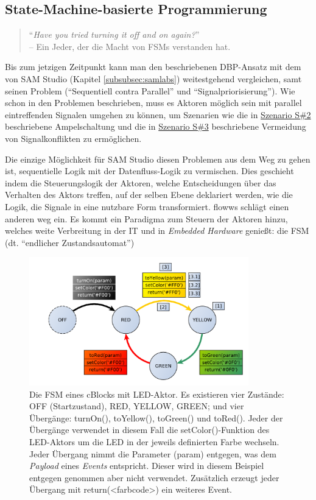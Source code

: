 \subsection{State-Machine-basierte Programmierung}\label{subsec:fsmprogrammierung}
\begin{quote}
    "`\textit{Have you tried turning it off and on again?}"'  \\ -- Ein Jeder, der die Macht von \acp{FSM} verstanden hat.
\end{quote}

Bis zum jetzigen Zeitpunkt kann man den beschriebenen \ac{DBP}-Ansatz mit dem von SAM Studio (Kapitel \ref{subsubsec:samlabs}) weitestgehend vergleichen, samt seinen Problem ("`Sequentiell contra Parallel"' und "`Signalpriorisierung"'). Wie schon in den Problemen beschrieben, muss es Aktoren möglich sein mit parallel eintreffenden Signalen umgehen zu können, um Szenarien wie die in \hyperref[szenario2]{Szenario S\#2}  beschriebene Ampelschaltung und die in \hyperref[szenario3]{Szenario S\#3} beschriebene Vermeidung von Signalkonflikten zu ermöglichen.

Die einzige Möglichkeit für SAM Studio diesen Problemen aus dem Weg zu gehen ist, sequentielle Logik mit der Datenfluss-Logik zu vermischen. Dies geschieht indem die Steuerungslogik der Aktoren, welche Entscheidungen über das Verhalten des Aktors treffen, auf der selben Ebene deklariert werden, wie die Logik, die Signale in eine nutzbare Form transformiert. flowws schlägt einen anderen weg ein. Es kommt ein Paradigma zum Steuern der Aktoren hinzu, welches weite Verbreitung in der IT und in \textit{Embedded Hardware} genießt: die \acl{FSM} (dt. "`endlicher Zustandsautomat"')

\begin{figure}[h]
  \centering
  \includegraphics[width=0.85\textwidth]{bilder/chapter4/chapter4_2/beispielstatemachine.pdf}
  \caption{Die \ac{FSM} eines cBlocks mit LED-Aktor. Es existieren vier Zustände: OFF (Startzustand), RED, YELLOW, GREEN; und vier Übergänge: turnOn(), toYellow(), toGreen() und toRed(). Jeder der Übergänge verwendet in diesem Fall die setColor()-Funktion des LED-Aktors um die LED in der jeweils definierten Farbe wechseln. Jeder Übergang nimmt die Parameter (param) entgegen, was dem \textit{Payload} eines \textit{Events} entspricht. Dieser wird in diesem Beispiel entgegen genommen aber nicht verwendet. Zusätzlich erzeugt jeder Übergang mit return(<farbcode>) ein weiteres Event.}
  \label{fig:beispielfsm}
\end{figure}

